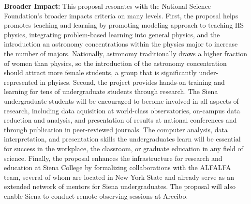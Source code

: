 \documentclass[11pt, preprint]{aastex}
\begin{document}
{{\bf Broader Impact:} This proposal resonates with the National Science Foundation's {broader impacts}
criteria on many levels.  
First, the proposal helps promotes teaching and learning by
promoting
modeling approach to teaching HS physics, integrating problem-based learning into general physics,
and the introduction an astronomy 
concentrations within the physics major to increase the number of majors.
Nationally, astronomy traditionally draws a higher fraction of women than physics, so 
the introduction of the astronomy concentration should attract more female students, 
a group that is significantly under-represented in phyiscs.
Second, the project provides hands-on training and learning for tens of 
undergraduate students through research.  
The Siena undergraduate students will be 
encouraged to become involved in all aspects
of research, including data aquisition at world-class observatories, on-campus 
data reduction and analysis, and presentation of results at national
conferences and through publication in peer-reviewed journals.
The computer analysis, data interpretation, and presentation skills the
undergraduates learn 
will be essential for success in
the workplace, the classroom, or graduate education in any field of science. 
Finally,
the proposal enhances the infrastructure for research and education at Siena College 
by formalizing collaborations
with the ALFALFA team, several of whom are located in New York State and already serve as an
extended network of mentors for Siena undergraduates.
The proposal will also enable Siena to conduct remote observing sessions at Arecibo.

}
\end{document}
